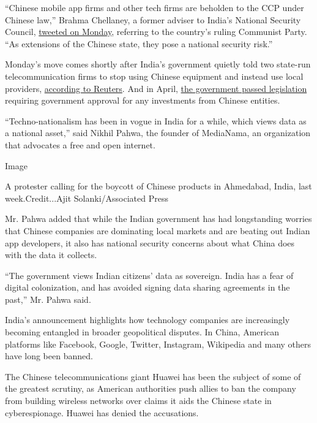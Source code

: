 ``Chinese mobile app firms and other tech firms are beholden to the CCP
under Chinese law,'' Brahma Chellaney, a former adviser to India's
National Security Council,
\href{https://twitter.com/Chellaney/status/1277646337803038721}{tweeted
on Monday}, referring to the country's ruling Communist Party. ``As
extensions of the Chinese state, they pose a national security risk.''

Monday's move comes shortly after India's government quietly told two
state-run telecommunication firms to stop using Chinese equipment and
instead use local providers,
\href{https://economictimes.indiatimes.com/industry/telecom/telecom-news/india-to-bar-bsnl-from-sourcing-gear-from-huawei-zte-may-also-bar-pvt-telcos-from-using-chinese-gear/articleshow/76431605.cms?utm_source=contentofinterest\&utm_medium=text\&utm_campaign=cppst}{according
to Reuters}. And in April,
\href{https://www.reuters.com/article/us-health-coronavirus-india-investments/india-toughens-rules-on-investments-from-neighbours-seen-aimed-at-china-idUSKBN2200LQ}{the
government passed legislation} requiring government approval for any
investments from Chinese entities.

``Techno-nationalism has been in vogue in India for a while, which views
data as a national asset,'' said Nikhil Pahwa, the founder of MediaNama,
an organization that advocates a free and open internet.

Image

A protester calling for the boycott of Chinese products in Ahmedabad,
India, last week.Credit...Ajit Solanki/Associated Press

Mr. Pahwa added that while the Indian government has had longstanding
worries that Chinese companies are dominating local markets and are
beating out Indian app developers, it also has national security
concerns about what China does with the data it collects.

``The government views Indian citizens' data as sovereign. India has a
fear of digital colonization, and has avoided signing data sharing
agreements in the past,'' Mr. Pahwa said.

India's announcement highlights how technology companies are
increasingly becoming entangled in broader geopolitical disputes. In
China, American platforms like Facebook, Google, Twitter, Instagram,
Wikipedia and many others have long been banned.

The Chinese telecommunications giant Huawei has been the subject of some
of the greatest scrutiny, as American authorities push allies to ban the
company from building wireless networks over claims it aids the Chinese
state in cyberespionage. Huawei has denied the accusations.


